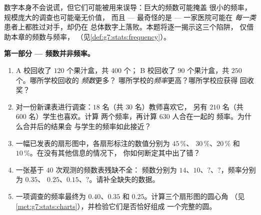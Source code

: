 \begin{problem}
\label{pb:g7:stats:1}
数字本身不会说谎，但它们可能被用来误导：巨大的频数可能掩盖
很小的频率，规模庞大的调查也可能毫无价值，
而且 --- 最奇怪的是 --- 一家医院可能在
\emph{每一类}患者上都胜过对手，却仍在
总体数字上落败。本题将逐一揭示这三个陷阱，
仅借助本章的频数与频率，
（见\cref{def:g7:stats:frequency}）。

\medskip
\noindent\textbf{第一部分 --- 频数并非频率。}
\begin{enumerate}
  \item A 校回收了 $120$ 个果汁盒，共 $400$ 个；
        B 校回收了 $90$ 个果汁盒，共 $250$ 个。哪所学校回收的
        \emph{频数}更多？
        哪所学校的\emph{频率}更高？哪所学校应获得
        回收奖？
  \item 对一份新课表进行调查：$18$ 名（共 $30$ 名）教师喜欢它，
        另有 $210$ 名（共 $600$ 名）学生也喜欢。计算
        两个频率，再计算 $630$ 人合在一起的
        频率。为什么合并后的结果会
        与学生的频率如此接近？
  \item 一幅已发表的扇形图中，各扇形标注的数值分别为 $45\,\%$、
        $30\,\%$、$20\,\%$ 和 $10\,\%$。在没有其他信息的情况下，
        你如何断定其中出了错？
  \item 一张基于 $40$ 次观测的频数表残缺不全：
        频数分别为 $14$、$10$、$?$、$?$，频率分别为 $0.35$、
        $0.25$、$0.15$、$?$。请补全缺失的数据。
  \item 一项调查的频率最终为 $0.40$、$0.35$ 和
        $0.25$。计算三个扇形图的圆心角
        （见\cref{met:g7:stats:charts}），并检验它们是否恰好组成
        一个完整的圆。
\end{enumerate}


\end{problem}
